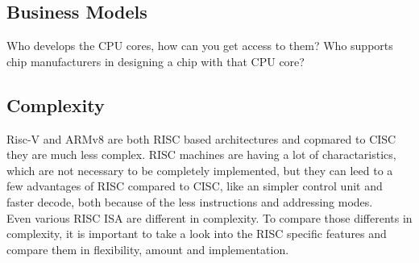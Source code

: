 \documentclass[conference]{IEEEtran}
\begin{document}
	\subsection{Business Models}
	Who develops the CPU cores, how can you get access to them? Who supports chip manufacturers in designing a chip with that CPU core?
	\subsection{Complexity}
	Risc-V and ARMv8 are both \gls{RISC} based architectures and copmared to \gls{CISC} they are much less complex. \gls{RISC} machines are having a lot of charactaristics, which are not necessary to be completely implemented, but they can leed to a few advantages of \gls{RISC} compared to \gls{CISC},  like an simpler control unit and faster decode, both because of the less instructions and addressing modes. \cite{George1990}\\
	Even various \gls{RISC} \gls{ISA} are different in complexity. To compare those differents in complexity, it is important to take a look into the RISC specific features and compare them in flexibility, amount and implementation.
\end{document}

